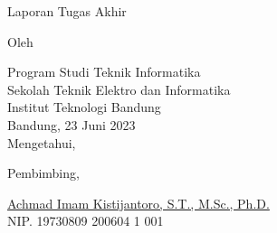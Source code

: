 \clearpage
\pagestyle{empty}

\begin{center}
    \smallskip
    
    \Large \bfseries \MakeUppercase{\thetitle}
    \vfill
    
    \Large Laporan Tugas Akhir
    \vfill
    
    \large Oleh
    
    \Large \theauthor
    
    \large Program Studi Teknik Informatika \\
    
    \normalsize \normalfont
    Sekolah Teknik Elektro dan Informatika \\
    Institut Teknologi Bandung \\
    
    \vfill
    \normalsize \normalfont
    Bandung, 23 Juni 2023 \\
    Mengetahui,
    
    \vspace{0.5cm}
    Pembimbing,
    
    \vfill
    \underline{Achmad Imam Kistijantoro, S.T., M.Sc., Ph.D.} \\
    NIP. 19730809 200604 1 001
    
\end{center}
\clearpage
